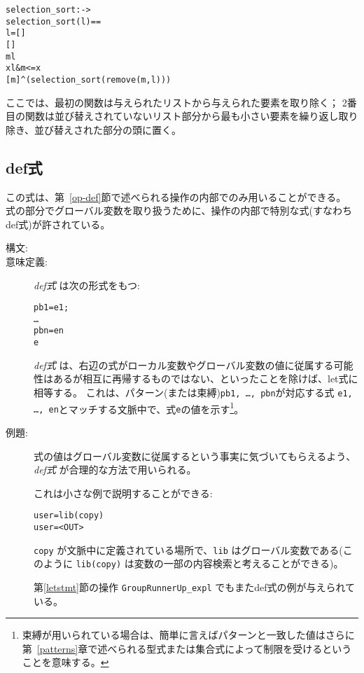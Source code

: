 \documentclass[\pformat,12pt]{jarticle}
\begin{document}
\begin{description}
\begin{alltt}
   selection_sort :  -> 
   selection_sort (l) ==
      l = []
      []
      m  l 
          x  l & m <= x
          [m]\verb+^+(selection_sort (remove(m,l)))
   \end{alltt}
   ここでは、最初の関数は与えられたリストから与えられた要素を取り除く；
2番目の関数は並び替えされていないリスト部分から最も小さい要素を繰り返し取り除き、並び替えされた部分の頭に置く。
\end{description}

\subsection{def式} \label{define-exp}

この式は、第~\ref{op-def}節で述べられる操作の内部でのみ用いることができる。
式の部分でグローバル変数を取り扱うために、操作の内部で特別な式(すなわちdef式)が許されている。

\begin{description}
\item[構文:]


\item[意味定義:] {\it def式} は次の形式をもつ:
  \begin{alltt}
     pb1 = e1;
        \ldots
        pbn = en
      e
  \end{alltt}
   {\it def式} は、右辺の式がローカル変数やグローバル変数の値に従属する可能性はあるが相互に再帰するものではない、といったことを除けば、let式に相等する。
これは、パターン(または束縛){\tt pb1, \ldots, pbn}が対応する式 {\tt e1, \ldots,    en}とマッチする文脈中で、式{\tt e}の値を示す\footnote{束縛が用いられている場合は、簡単に言えばパターンと一致した値はさらに第~\ref{patterns}章で述べられる型式または集合式によって制限を受けるということを意味する。}。

\item[例題:] 式の値はグローバル変数に従属するという事実に気づいてもらえるよう、{\it def式} が合理的な方法で用いられる。

 これは小さな例で説明することができる:
  \begin{alltt}
     user = lib(copy) 
       user = <OUT>
       
       
  \end{alltt}      
   {\tt copy} が文脈中に定義されている場所で、{\tt lib} はグローバル変数である(このように {\tt lib(copy)} は変数の一部の内容検索と考えることができる)。

  第\ref{letstmt}節の操作 \texttt{GroupRunnerUp\_expl} でもまたdef式の例が与えられている。
\end{description}
\end{document}
